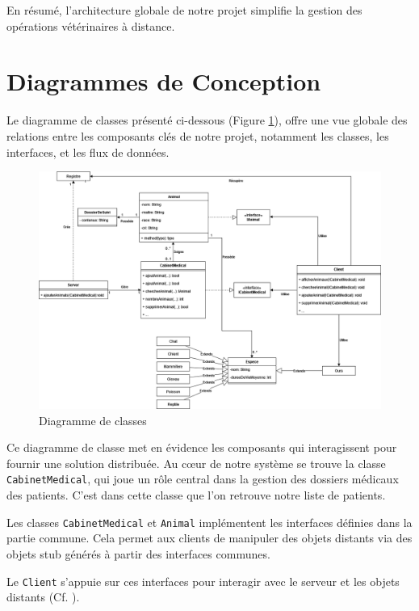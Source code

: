 \documentclass{article} %
\begin{document}
En résumé, l'architecture globale de notre projet simplifie la gestion des
opérations vétérinaires à distance.

\newpage
\section{Diagrammes de Conception}

Le diagramme de classes présenté ci-dessous (Figure \ref{fig:diagramme-classe}),
offre une vue globale des relations entre les composants clés de notre projet,
notamment les classes, les interfaces, et les flux de données.

\begin{figure}[h]
    \centering
    \includegraphics[width=1\textwidth]{classe}
    \caption{Diagramme de classes}
    \label{fig:diagramme-classe}
\end{figure}

Ce diagramme de classe met en évidence les composants qui interagissent pour fournir une solution distribuée.
Au cœur de notre système se trouve la classe \texttt{CabinetMedical}, qui joue un rôle central dans la gestion
des dossiers médicaux des patients. C'est dans cette classe que l'on retrouve notre liste de patients.

Les classes \texttt{CabinetMedical} et \texttt{Animal} implémentent les interfaces définies dans la partie commune.
Cela permet aux clients de manipuler des objets distants via des objets stub
générés à partir des interfaces communes.

Le \texttt{Client} s'appuie sur ces interfaces pour interagir avec le serveur et les objets distants (Cf. ).
\end{document}
